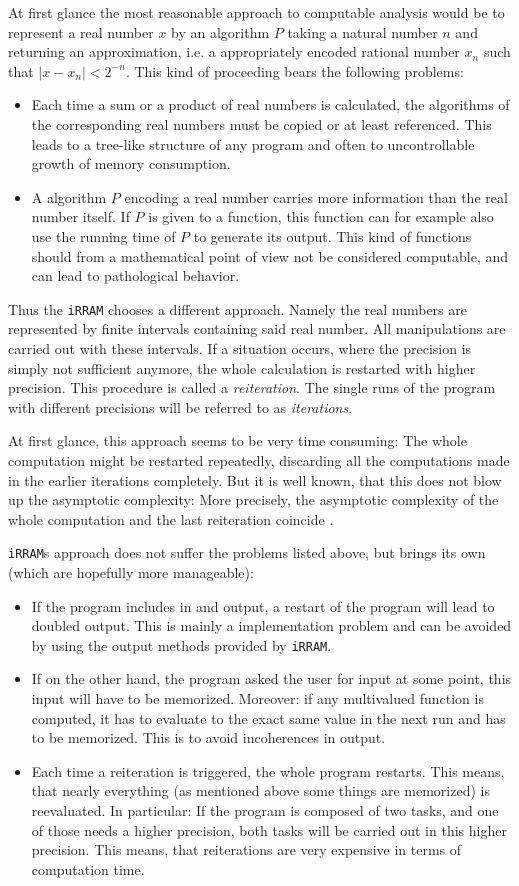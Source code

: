 \documentclass{article}
\newcommand{\irram}{\texttt{iRRAM}\xspace}
\newcommand{\irrams}{\texttt{iRRAM}s\xspace}
\begin{document}
At first glance the most reasonable approach to computable analysis would be to represent a real number $x$ by an algorithm $P$ taking a natural number $n$ and returning an approximation, i.e. a appropriately encoded rational number $x_n$ such that $|x-x_n|<2^{-n}$. This kind of proceeding bears the following problems:
\begin{itemize}
\item Each time a sum or a product of real numbers is calculated, the algorithms of the corresponding real numbers must be copied or at least referenced. This leads to a tree-like structure of any program and often to uncontrollable growth of memory consumption.
\item A algorithm $P$ encoding a real number carries more information than the real number itself. If $P$ is given to a function, this function can for example also use the running time of $P$ to generate its output. This kind of functions should from a mathematical point of view not be considered computable, and can lead to pathological behavior.
\end{itemize}

Thus the \irram chooses a different approach. Namely the real numbers are represented by finite intervals containing said real number. All manipulations are carried out with these intervals. If a situation occurs, where the precision is simply not sufficient anymore, the whole calculation is restarted with higher precision. This procedure is called a \emph{reiteration}. The single runs of the program with different precisions will be referred to as \emph{iterations}.

At first glance, this approach seems to be very time consuming: The whole computation might be restarted repeatedly, discarding all the computations made in the earlier iterations completely. But it is well known, that this does not blow up the asymptotic complexity: More precisely, the asymptotic complexity of the whole computation and the last reiteration coincide \cite{}.

\irrams approach does not suffer the problems listed above, but brings its own (which are hopefully more manageable):
\begin{itemize}
\item If the program includes in and output, a restart of the program will lead to doubled output. This is mainly a implementation problem and can be avoided by using the output methods provided by \irram.
\item If on the other hand, the program asked the user for input at some point, this input will have to be memorized. Moreover: if any multivalued function is computed, it has to evaluate to the exact same value in the next run and has to be memorized. This is to avoid incoherences in output.
\item Each time a reiteration is triggered, the whole program restarts. This means, that nearly everything (as mentioned above some things are memorized) is reevaluated. In particular: If the program is composed of two tasks, and one of those needs a higher precision, both tasks will be carried out in this higher precision. This means, that reiterations are very expensive in terms of computation time.
\end{itemize}
\end{document}
